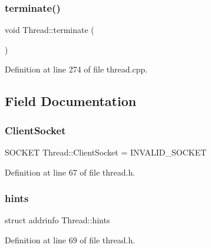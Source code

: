 \mbox{\label{class_thread_a1ca03e56eccdb06ca9efb32cee4063b9}} 
\subsubsection{\texorpdfstring{terminate()}{terminate()}}
{\footnotesize\ttfamily void Thread\+::terminate (\begin{DoxyParamCaption}{ }\end{DoxyParamCaption})}



Definition at line 274 of file thread.\+cpp.



\subsection{Field Documentation}
\mbox{\label{class_thread_a4ba1ac27a80f640f16522192482a490d}} 
\subsubsection{\texorpdfstring{Client\+Socket}{ClientSocket}}
{\footnotesize\ttfamily S\+O\+C\+K\+ET Thread\+::\+Client\+Socket = I\+N\+V\+A\+L\+I\+D\+\_\+\+S\+O\+C\+K\+ET\hspace{0.3cm}{\ttfamily [private]}}



Definition at line 67 of file thread.\+h.

\mbox{\label{class_thread_a548be7819a538cd747af578cd50e8cc0}} 
\subsubsection{\texorpdfstring{hints}{hints}}
{\footnotesize\ttfamily struct addrinfo Thread\+::hints\hspace{0.3cm}{\ttfamily [private]}}



Definition at line 69 of file thread.\+h.

\mbox{\label{class_thread_ac6084f44e9af9c2df1f58d77403468ec}} 
